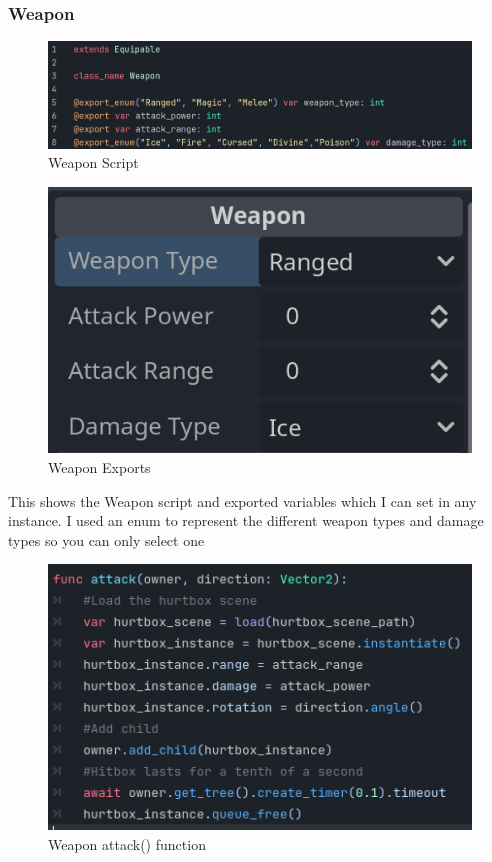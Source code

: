 \documentclass{article}
\begin{document}
        \subsubsection{Weapon}
        \begin{multicols}{2}
                \begin{figure}[H]
                        \centering
                        \includegraphics[width = \columnwidth]{images/development/Weapon_script.PNG}
                        \caption{Weapon Script}
                \end{figure}
                \begin{figure}[H]
                        \centering
                        \includegraphics[width = 0.9\columnwidth]{images/development/Weapon_export.PNG}
                        \caption{Weapon Exports}
                \end{figure}
        \end{multicols}
        \[\]
        This shows the Weapon script and exported variables which I can set in any instance. I used an enum to represent the different weapon types and damage types so you can only select one
        \begin{figure}[H]
                \centering
                \includegraphics[width = \columnwidth]{images/development/Weapon_attack.PNG}
                \caption{Weapon attack() function}
        \end{figure}
\end{document}
